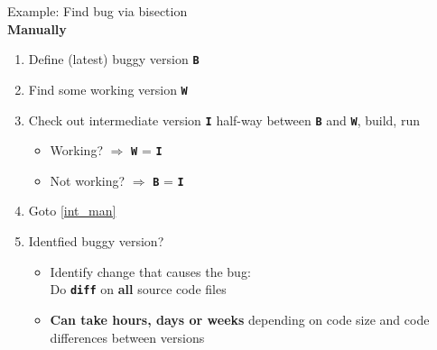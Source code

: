 \begin{frame}[fragile]
\emptyframetitle

Example: Find bug via bisection\\[7pt]

\textbf{Manually}
\begin{enumerate}
  \item Define (latest) buggy version \textbf{\texttt{B}}
  \item Find some working version \textbf{\texttt{W}}
  \item Check out intermediate version \textbf{\texttt{I}} half-way between \textbf{\texttt{B}} and \textbf{\texttt{W}}, build, run\label{int_man}
  \begin{itemize}
    \normalsize
    \item Working? $\Rightarrow$ \textbf{\texttt{W}} = \textbf{\texttt{I}}
    \item Not working? $\Rightarrow$ \textbf{\texttt{B}} = \textbf{\texttt{I}}
  \end{itemize}
  \item Goto \ref{int_man}
  \item Identfied buggy version?
  \begin{itemize}
    \normalsize
    \item Identify change that causes the bug:\\
    Do \textbf{\texttt{diff}} on \textbf{all} source code files
    \item \textbf{Can take hours, days or weeks} depending on code size and code differences between versions
  \end{itemize}
\end{enumerate}

\end{frame}

